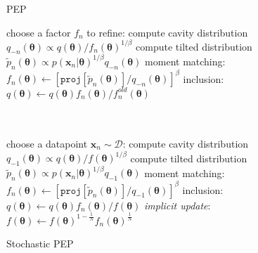 \documentclass{article} %
\begin{document}
\begin{figure}[!t]
\begin{minipage}[t]{0.45\linewidth}
\centering
\begin{algorithm}[H] 
\caption{PEP} \small
\label{alg:pep} 
\begin{algorithmic}[1] 
	\STATE choose a factor $f_n$ to refine:
	\STATE compute cavity distribution \\$q_{-n}(\bm{\theta}) \propto q(\bm{\theta}) / f_n(\bm{\theta})^{1/\beta}$ 
	\STATE compute tilted distribution \\$\tilde{p}_n(\bm{\theta}) \propto p(\bm{x}_n|\bm{\theta})^{1 / \beta} q_{-n}(\bm{\theta})$
	\STATE moment matching: \\ \hspace{-1mm}$f_n(\bm{\theta}) \leftarrow [\mathtt{proj}[\tilde{p}_n(\bm{\theta})] / q_{-n}(\bm{\theta})]^{\beta} $
	\STATE inclusion:\\ $q(\bm{\theta}) \leftarrow q(\bm{\theta}) f_n(\bm{\theta}) / f_n^{old}(\bm{\theta})$\\
	\hspace{1mm}\\ \vspace{1.5mm} \hspace{1mm}\\
\end{algorithmic}
\end{algorithm}
\end{minipage}
%
\quad
%
\begin{minipage}[t]{0.45\linewidth}
\centering
\begin{algorithm}[H]
\caption{Stochastic PEP} \small
\label{alg:spep} 
\begin{algorithmic}[1] 
	\STATE choose a datapoint $\bm{x}_n\sim \mathcal{D}$:
	\STATE compute cavity distribution \\ $q_{-1}(\bm{\theta}) \propto q(\bm{\theta}) / f(\bm{\theta})^{1/\beta}$
	\STATE compute tilted distribution \\$\tilde{p}_n(\bm{\theta}) \propto p(\bm{x}_n|\bm{\theta})^{1/\beta} q_{-1}(\bm{\theta})$
	\STATE moment matching: \\\hspace{-1mm}$f_n(\bm{\theta}) \leftarrow [\mathtt{proj}[\tilde{p}_n(\bm{\theta})] / q_{-1}(\bm{\theta})]^{\beta} $
	\STATE inclusion:\\ $q(\bm{\theta}) \leftarrow q(\bm{\theta}) f_n(\bm{\theta}) / f(\bm{\theta})$
	\STATE \textit{implicit update}:\\ $f(\bm{\theta}) \leftarrow f(\bm{\theta})^{1 - \frac{1}{N}} f_n(\bm{\theta})^{\frac{1}{N}}$
\end{algorithmic}
\end{algorithm}
\end{minipage} 
%
\end{figure}
\end{document}

